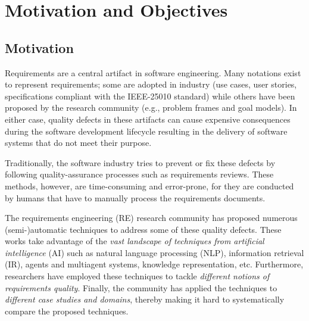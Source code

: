\documentclass[conference,9pt]{IEEEtran}
\begin{document}

\IEEEpeerreviewmaketitle

\section{Motivation and Objectives}
\subsection{Motivation}
Requirements are a central artifact in software engineering. Many notations exist to represent requirements; some are adopted in industry (use cases, user stories, specifications compliant with the IEEE-25010 standard) while others have been proposed by the research community (e.g., problem frames and goal models). In either case, quality defects in these artifacts can cause expensive consequences during the software development lifecycle resulting in the delivery of software systems that do not meet their purpose.

Traditionally, the software industry tries to prevent or fix these defects by following quality-assurance processes such as requirements reviews. These methods, however, are time-consuming and error-prone, for they are conducted by humans that have to manually process the requirements documents.

The requirements engineering (RE) research community has proposed numerous (semi-)automatic techniques to address some of these quality defects. These works take advantage of the \textit{vast landscape of techniques from artificial intelligence} (AI) such as natural language processing (NLP), information retrieval (IR), agents and multiagent systems, knowledge representation, etc. Furthermore, researchers have employed these techniques to tackle \textit{different notions of requirements quality}. Finally, the community has applied the techniques to \textit{different case studies and domains}, thereby making it hard to systematically compare the proposed techniques.
\end{document}

